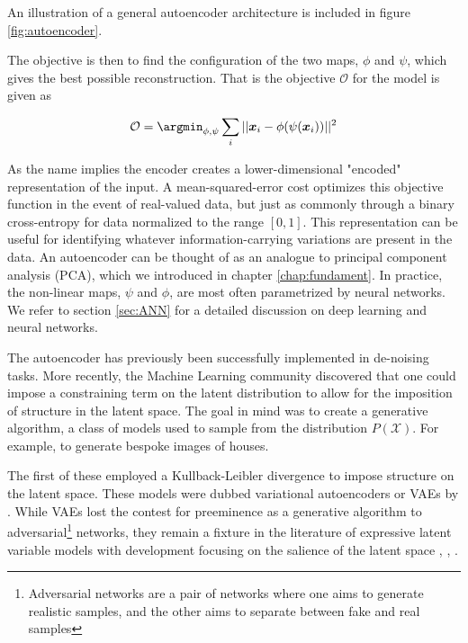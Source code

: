 \noindent An illustration of a general autoencoder architecture is included in figure \ref{fig:autoencoder}.

The objective is then to find the configuration of the two maps, $\phi$ and $\psi$, which gives the best possible reconstruction. That is the objective $\mathcal{O}$ for the model is given as

\begin{align}\label{eq:objective_autoenc}
  \mathcal{O} = \argmin_{\phi, \psi} \sum_i || \boldsymbol{x}_i - \phi(\psi( \boldsymbol{x}_i ))  ||^2
\end{align}

\noindent  As the name implies the encoder creates a lower-dimensional "encoded" representation of the input. A mean-squared-error cost optimizes this objective function in the event of real-valued data, but just as commonly through a binary cross-entropy for data normalized to the range $[0, 1]$. This representation can be useful for identifying whatever information-carrying variations are present in the data. An autoencoder can be thought of as an analogue to principal component analysis (PCA)\cite{Marsland2009}, which we introduced in chapter \ref{chap:fundament}. In practice, the non-linear maps, $\psi$ and $\phi$, are most often parametrized by neural networks. We refer to section \ref{sec:ANN} for a detailed discussion on deep learning and neural networks.

The autoencoder has previously been successfully implemented in de-noising tasks. More recently, the Machine Learning community discovered that one could impose a constraining term on the latent distribution to allow for the imposition of structure in the latent space. The goal in mind was to create a generative algorithm, a class of models used to sample from the distribution $P(\mathcal{X})$. For example, to generate bespoke images of houses. 

The first of these employed a Kullback-Leibler divergence to impose structure on the latent space. These models were dubbed variational autoencoders or VAEs by \citet{Kingma2013}. While VAEs lost the contest for preeminence as a generative algorithm to adversarial\footnote{Adversarial networks are a pair of networks where one aims to generate realistic samples, and the other aims to separate between fake and real samples} networks, they remain a fixture in the literature of expressive latent variable models with development focusing on the salience of the latent space \cite{Higgins2017}, \cite{Zhao}, \cite{Fertig}.

